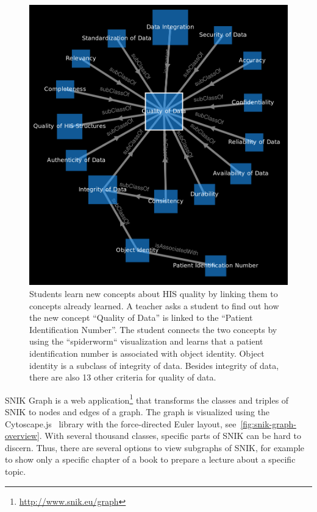 \documentclass[sw]{iosart2x}
\renewcommand{\citep}{\cite}%
\begin{document}
\begin{figure}
\caption{Students learn new concepts about HIS quality by linking them to concepts already learned.
A teacher asks a student to find out how the new concept \enquote{Quality of Data} is linked to the \enquote{Patient Identification Number}.
The student connects the two concepts by using the “spiderworm“ visualization and learns that a patient identification number is associated with object identity.
Object identity is a subclass of integrity of data.
Besides integrity of data, there are also 13 other criteria for quality of data.}
\label{fig:snik-graph-spiderworm}
\includegraphics[width=\columnwidth]{img/snik-graph-spiderworm.png}
\end{figure}
SNIK Graph is a web application\footnote{\url{http://www.snik.eu/graph}} that transforms the classes and triples of SNIK to nodes and edges of a graph.
The graph is visualized using the Cytoscape.js~\citep{cytoscape} library with the force-directed Euler layout, see~\cref{fig:snik-graph-overview}.
With several thousand classes, specific parts of SNIK can be hard to discern.
Thus, there are several options to view subgraphs of SNIK, for example to show only a specific chapter of a book to prepare a lecture about a specific topic.
\end{document}

